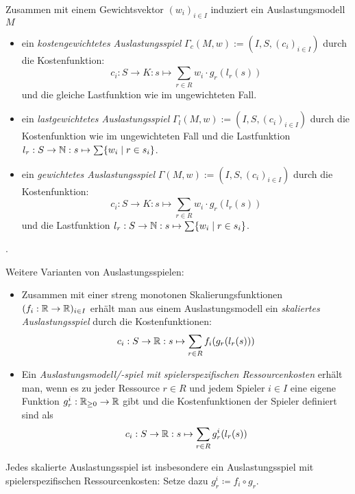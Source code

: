 \begin{defn}\label{def:gewAuslastungsspiel}
	Zusammen mit einem Gewichtsvektor $(w_i)_{i\in I}$ induziert ein Auslastungsmodell $M$ 
	\begin{itemize}
		\item ein \emph{kostengewichtetes Auslastungsspiel} $\Gamma_c(M, w) := (I, S, (c_i)_{i \in I})$ durch die Kostenfunktion:
		\[c_i: S \to K: s \mapsto \sum_{r \in R} w_i\cdot g_r(l_r(s)) \]
		und die gleiche Lastfunktion wie im ungewichteten Fall.
		\item ein \emph{lastgewichtetes Auslastungsspiel} $\Gamma_l(M, w) := (I, S, (c_i)_{i \in I})$ durch die Kostenfunktion wie im ungewichteten Fall und die Lastfunktion $l_r: S \to \mathbb{N}: s \mapsto \sum\{w_i \mid r \in s_i\}$.
		\item ein \emph{gewichtetes Auslastungsspiel} $\Gamma(M, w) := (I, S, (c_i)_{i \in I})$ durch die Kostenfunktion:
		\[c_i: S \to K: s \mapsto \sum_{r \in R} w_i\cdot g_r(l_r(s)) \]
		und die Lastfunktion $l_r: S \to \mathbb{N}: s \mapsto \sum\{w_i \mid r \in s_i\}$.
	\end{itemize}	
\end{defn}

\begin{bsp}.
	
\end{bsp}

Weitere Varianten von Auslastungsspielen:

\begin{defn}\label{def:weitereAuslastungsspiel}
	\begin{itemize}
		\item Zusammen mit einer streng monotonen Skalierungsfunktionen $(f_i: \mathbb{R} \to \mathbb{R})_{i\in I}$ erhält man aus einem Auslastungsmodell ein \emph{skaliertes Auslastungsspiel} durch die Kostenfunktionen:
			\[c_i: S \to \mathbb{R}: s \mapsto \sum_{r \in R} f_i(g_r(l_r(s))) \]
		\item Ein \emph{Auslastungsmodell/-spiel mit spielerspezifischen Ressourcenkosten} erhält man, wenn es zu jeder Ressource $r \in R$ und jedem Spieler $i \in I$ eine eigene Funktion $g_r^i: \mathbb{R}_{\geq 0} \to \mathbb{R}$ gibt und die Kostenfunktionen der Spieler definiert sind als
			\[c_i: S \to \mathbb{R}: s \mapsto \sum_{r \in R} g_r^i(l_r(s)) \]
	\end{itemize}
\end{defn}

\begin{bem}
	Jedes skalierte Auslastungsspiel ist insbesondere ein Auslastungsspiel mit spielerspezifischen Ressourcenkosten: Setze dazu $g_r^i \coloneqq f_i \circ g_r$.
\end{bem}

